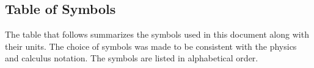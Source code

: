 \documentclass[12pt]{article}
\begin{document}

\subsection{Table of Symbols}

The table that follows summarizes the symbols used in this document along with
their units.  The choice of symbols was made to be consistent with the physics 
and calculus 
notation. The symbols are listed in alphabetical order.

\renewcommand{\arraystretch}{1.2}
\end{document}
